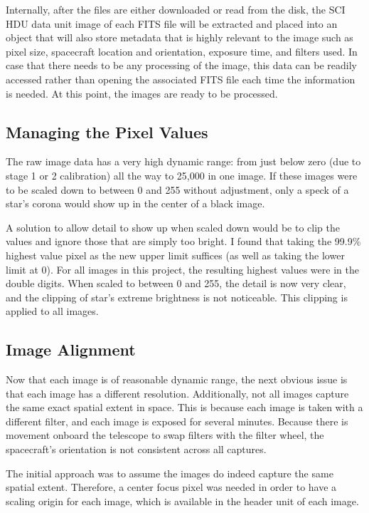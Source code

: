 \documentclass[10pt,twocolumn,letterpaper]{article}
\begin{document}
Internally, after the files are either downloaded or read from the disk, the SCI HDU data unit image of each FITS file will be extracted and placed into an object that will also store metadata that is highly relevant to the image such as pixel size, spacecraft location and orientation, exposure time, and filters used. 
In case that there needs to be any processing of the image, this data can be readily accessed rather than opening the associated FITS file each time the information is needed. At this point, the images are ready to be processed.

\subsection{Managing the Pixel Values}
The raw image data has a very high dynamic range: from just below zero (due to stage 1 or 2 calibration) all the way to 25,000 in one image. If these images were to be scaled down to between 0 and 255 without adjustment, only a speck of a star's corona would show up in the center of a black image.

A solution to allow detail to show up when scaled down would be to clip the values and ignore those that are simply too bright. I found that taking the 99.9\% highest value pixel as the new upper limit suffices (as well as taking the lower limit at 0). 
For all images in this project, the resulting highest values were in the double digits. When scaled to between 0 and 255, the detail is now very clear, and the clipping of star's extreme brightness is not noticeable. This clipping is applied to all images.

\subsection{Image Alignment}

Now that each image is of reasonable dynamic range, the next obvious issue is that each image has a different resolution. Additionally, not all images capture the same exact spatial extent in space. This is because each image is taken with a different filter, and each image is exposed for several minutes. Because there is movement onboard the telescope to swap filters with the filter wheel, the spacecraft's orientation is not consistent across all captures.

The initial approach was to assume the images do indeed capture the same spatial extent. Therefore, a center focus pixel was needed in order to have a scaling origin for each image, which is available in the header unit of each image.
\end{document}
